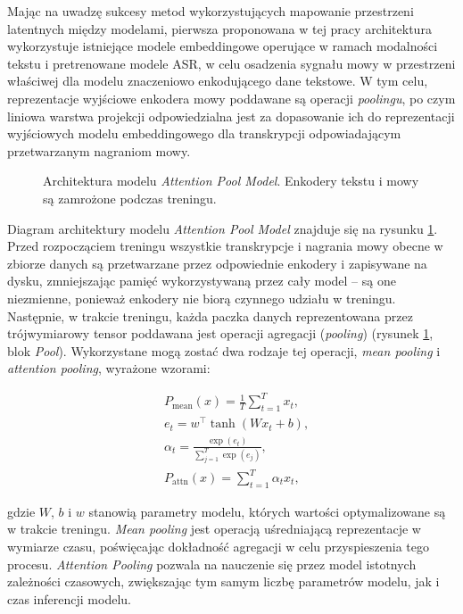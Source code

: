 Mając na uwadzę sukcesy metod wykorzystujących mapowanie przestrzeni latentnych między modelami, pierwsza proponowana w tej pracy architektura wykorzystuje istniejące modele embeddingowe operujące w ramach modalności tekstu i pretrenowane modele ASR, w celu osadzenia sygnału mowy w przestrzeni właściwej dla modelu znaczeniowo enkodującego dane tekstowe. W tym celu, reprezentacje wyjściowe enkodera mowy poddawane są operacji \textit{poolingu}, po czym liniowa warstwa projekcji odpowiedzialna jest za dopasowanie ich do reprezentacji wyjściowych modelu embeddingowego dla transkrypcji odpowiadającym przetwarzanym nagraniom mowy.

\begin{figure}[htbp]
    \centering
    \vspace{6pt}
    \caption{Architektura modelu \textit{Attention Pool Model}. Enkodery tekstu i mowy są zamrożone podczas treningu.}
    \label{fig:apmArchitecture}
\end{figure}

Diagram architektury modelu \textit{Attention Pool Model} znajduje się na rysunku \ref{fig:apmArchitecture}. Przed rozpocząciem treningu wszystkie transkrypcje i nagrania mowy obecne w zbiorze danych są przetwarzane przez odpowiednie enkodery i zapisywane na dysku, zmniejszając pamięć wykorzystywaną przez cały model -- są one niezmienne, ponieważ enkodery nie biorą czynnego udziału w treningu. Następnie, w trakcie treningu, każda paczka danych reprezentowana przez trójwymiarowy tensor poddawana jest operacji agregacji (\textit{pooling}) (rysunek \ref{fig:apmArchitecture}, blok \textit{Pool}). Wykorzystane mogą zostać dwa rodzaje tej operacji, \textit{mean pooling} i \textit{attention pooling}, wyrażone wzorami:

\begin{equation}
\begin{aligned}
&P_{\mathrm{mean}}(x) = \frac{1}{T}\sum_{t=1}^{T}x_t, \\
&e_t = w^{\top}\tanh(W x_t+b), \\
&\alpha_t = \frac{\exp(e_t)}{\sum_{j=1}^{T}\exp(e_j)}, \\
&P_{\mathrm{attn}}(x) = \sum_{t=1}^{T}\alpha_t x_t,
\end{aligned}
\end{equation}

gdzie $W$, $b$ i $w$ stanowią parametry modelu, których wartości optymalizowane są w trakcie treningu. \textit{Mean pooling} jest operacją uśredniającą reprezentacje w wymiarze czasu, poświęcając dokładność agregacji w celu przyspieszenia tego procesu. \textit{Attention Pooling} pozwala na nauczenie się przez model istotnych zależności czasowych, zwiększając tym samym liczbę parametrów modelu, jak i czas inferencji modelu.

